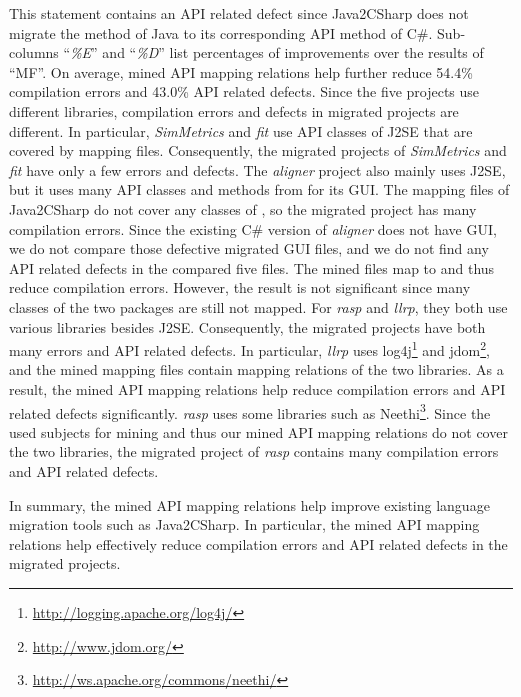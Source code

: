 This statement contains an API related defect since Java2CSharp does not migrate the  method of Java to its corresponding API method of C\#. Sub-columns ``\emph{\%E}'' and ``\emph{\%D}'' list
percentages of improvements over the results of ``MF''. On average,
mined API mapping relations help further reduce 54.4\% compilation errors
and 43.0\% API related defects. Since the five projects use different libraries,
compilation errors and defects in migrated projects are different. In particular,
\emph{SimMetrics} and \emph{fit} use API classes of J2SE that are
covered by mapping files. Consequently, the migrated projects of
\emph{SimMetrics} and \emph{fit} have only a few errors and defects. The
\emph{aligner} project also mainly uses J2SE, but it uses many API
classes and methods from  for its GUI. The mapping
files of Java2CSharp do not cover any classes of ,
so the migrated project has many compilation errors. Since the existing C\#
version of \emph{aligner} does not have GUI, we do not compare those
defective migrated GUI files, and we do not find any API related defects in the compared five files. The mined
files map  to  and
thus reduce compilation errors. However, the result is not
significant since many classes of the two packages are still not
mapped. For \emph{rasp} and \emph{llrp}, they both use various
libraries besides J2SE. Consequently, the migrated projects have
both many errors and API related defects. In particular, \emph{llrp} uses
log4j\footnote{\url{http://logging.apache.org/log4j/}} and
jdom\footnote{\url{http://www.jdom.org/}}, and the mined mapping
files contain mapping relations of the two libraries. As a result,
the mined API mapping relations help reduce compilation errors and
API related defects significantly. \emph{rasp} uses some libraries such as
Neethi\footnote{\url{http://ws.apache.org/commons/neethi/}}. Since the used
subjects for mining and thus our mined API mapping relations do not cover the
two libraries, the migrated project of \emph{rasp} contains many
compilation errors and API related defects.

In summary, the mined API mapping relations help improve existing language
migration tools such as Java2CSharp. In particular, the mined API
mapping relations help effectively reduce compilation errors and
API related defects in the migrated projects.

